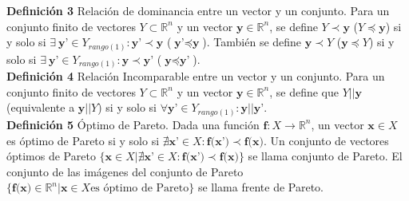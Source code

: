 

\noindent\textbf{Definición 3} Relación de dominancia entre un vector y un conjunto. Para un conjunto finito de vectores $Y \subset \mathbb{R}^n$ y un vector $\textbf{y} \in \mathbb{R}^n$, se define $Y \prec \textbf{y}$ ($Y \preceq \textbf{y}$) si y solo si $\exists \ \textbf{y'} \in  Y_{rango(1)}:\textbf{y'} \prec \textbf{y}$ ($\textbf{y'} \preceq \textbf{y}$). También se define $\textbf{y} \prec Y$ ($\textbf{y} \preceq Y $) si y solo si $\exists \ \textbf{y'} \in  Y_{rango(1)}:\textbf{y} \prec \textbf{y'}$ ($\textbf{y} \preceq \textbf{y'}$).\\


\noindent\textbf{Definición 4} Relación Incomparable entre un vector y un conjunto.  Para un conjunto finito de vectores $Y \subset \mathbb{R}^n$ y un vector $\textbf{y} \in \mathbb{R}^n$, se define que $Y || \textbf{y}$ (equivalente a $\textbf{y}||Y$) si y solo si $\forall \textbf{y'}\in Y_{rango(1)}:\textbf{y}||\textbf{y'}$.\\


\noindent \textbf{Definición 5} Óptimo de Pareto. Dada una función $\textbf{f}: X \rightarrow \mathbb{R}^n$, un vector $\textbf{x}\in X$ es óptimo de Pareto si y solo si $\nexists \textbf{x'}\in X: \textbf{f(x')} \prec \textbf{f(x)} $. Un conjunto de vectores óptimos de Pareto $\{ \textbf{x} \in X | \nexists \textbf{x'}\in X: \textbf{f(x')} \prec \textbf{f(x)} \}$ se llama conjunto de Pareto. El conjunto de las imágenes del conjunto de Pareto $\{ \textbf{f(x)} \in \mathbb{R}^n | \textbf{x}\in X \text{es óptimo de Pareto} \}$ se llama frente de Pareto.



